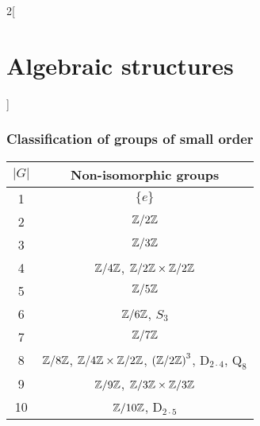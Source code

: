 \documentclass[../../../main.tex]{subfiles}
\begin{document}
\begin{multicols}{2}[\section{Algebraic structures}]
    \subsubsection*{Classification of groups of small order}
    \begin{center}
        \begin{tabular}{|c|c|}
            \hline
            $|G|$ & Non-isomorphic groups                                                                                                                \\
            \hline
            1     & $\{e\}$                                                                                                                              \\
            \hline
            2     & $\quot{\ZZ}{2\ZZ}$                                                                                                                   \\
            \hline
            3     & $\quot{\ZZ}{3\ZZ}$                                                                                                                   \\
            \hline
            4     & $\quot{\ZZ}{4\ZZ}$, $\quot{\ZZ}{2\ZZ}\times\quot{\ZZ}{2\ZZ}$                                                                         \\
            \hline
            5     & $\quot{\ZZ}{5\ZZ}$                                                                                                                   \\
            \hline
            6     & $\quot{\ZZ}{6\ZZ}$, $S_3$                                                                                                            \\
            \hline
            7     & $\quot{\ZZ}{7\ZZ}$                                                                                                                   \\
            \hline
            8     & $\quot{\ZZ}{8\ZZ}$, $\quot{\ZZ}{4\ZZ}\times\quot{\ZZ}{2\ZZ}$, $\left(\quot{\ZZ}{2\ZZ}\right)^3$, $\text{D}_{2\cdot 4}$, $\text{Q}_8$ \\
            \hline
            9     & $\quot{\ZZ}{9\ZZ}$, $\quot{\ZZ}{3\ZZ}\times\quot{\ZZ}{3\ZZ}$                                                                         \\
            \hline
            10    & $\quot{\ZZ}{10\ZZ}$, $\text{D}_{2\cdot 5}$                                                                                           \\

\end{tabular}
\end{center}
\end{multicols}
\end{document}
